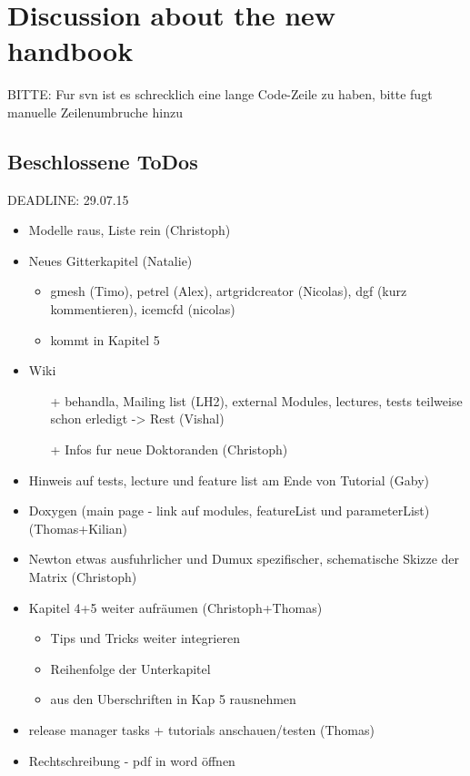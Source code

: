 \chapter{Discussion about the new handbook}

BITTE: Fur svn ist es schrecklich eine lange Code-Zeile zu haben, bitte fugt
manuelle Zeilenumbruche hinzu
\section{Beschlossene ToDos}
DEADLINE: 29.07.15
\begin{itemize}
  \item Modelle raus, Liste rein (Christoph)
  \item Neues Gitterkapitel (Natalie)
  \begin{itemize}
    \item gmesh (Timo), petrel (Alex), artgridcreator (Nicolas),
          dgf (kurz kommentieren), icemcfd (nicolas)
    \item kommt in Kapitel 5
  \end{itemize}
  \item Wiki
  \begin{itemize}
    \item[+] behandla, Mailing list (LH2), external Modules, lectures, tests
             teilweise schon erledigt -> Rest (Vishal)
    \item[+] Infos fur neue Doktoranden (Christoph)
  \end{itemize}
  \item Hinweis auf tests, lecture und feature list am Ende von Tutorial
        (Gaby)
  \item Doxygen (main page - link auf modules, featureList und parameterList)
        (Thomas+Kilian)
  \item Newton etwas ausfuhrlicher und Dumux spezifischer, schematische
        Skizze der Matrix (Christoph)
  \item Kapitel 4+5 weiter aufräumen (Christoph+Thomas)
  \begin{itemize}
    \item Tips und Tricks weiter integrieren
    \item Reihenfolge der Unterkapitel
    \item \Dumux aus den Uberschriften in Kap 5 rausnehmen
  \end{itemize}
  \item release manager tasks + tutorials anschauen/testen (Thomas)
  \item Rechtschreibung - pdf in word öffnen
\end{itemize}

